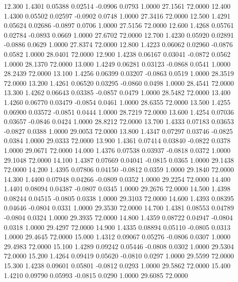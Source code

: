   12.300   1.4301   0.05388   0.02514  -0.0906   0.0793   1.0000  27.1561  72.0000
  12.400   1.4300   0.05502   0.02597  -0.0902   0.0748   1.0000  27.3416  72.0000
  12.500   1.4291   0.05624   0.02686  -0.0897   0.0706   1.0000  27.5156  72.0000
  12.600   1.4268   0.05761   0.02784  -0.0893   0.0669   1.0000  27.6702  72.0000
  12.700   1.4230   0.05920   0.02891  -0.0886   0.0629   1.0000  27.8374  72.0000
  12.800   1.4223   0.06062   0.02960  -0.0876   0.0582   1.0000  28.0401  72.0000
  12.900   1.4238   0.06167   0.03041  -0.0872   0.0562   1.0000  28.1370  72.0000
  13.000   1.4249   0.06281   0.03123  -0.0868   0.0541   1.0000  28.2439  72.0000
  13.100   1.4256   0.06399   0.03207  -0.0863   0.0519   1.0000  28.3519  72.0000
  13.200   1.4261   0.06520   0.03295  -0.0860   0.0498   1.0000  28.4541  72.0000
  13.300   1.4262   0.06643   0.03385  -0.0857   0.0479   1.0000  28.5482  72.0000
  13.400   1.4260   0.06770   0.03479  -0.0854   0.0461   1.0000  28.6355  72.0000
  13.500   1.4255   0.06900   0.03572  -0.0851   0.0444   1.0000  28.7219  72.0000
  13.600   1.4254   0.07036   0.03657  -0.0846   0.0424   1.0000  28.8212  72.0000
  13.700   1.4333   0.07183   0.03653  -0.0827   0.0388   1.0000  29.0053  72.0000
  13.800   1.4347   0.07297   0.03746  -0.0825   0.0384   1.0000  29.0333  72.0000
  13.900   1.4361   0.07414   0.03840  -0.0822   0.0378   1.0000  29.0671  72.0000
  14.000   1.4376   0.07538   0.03937  -0.0818   0.0372   1.0000  29.1048  72.0000
  14.100   1.4387   0.07669   0.04041  -0.0815   0.0365   1.0000  29.1438  72.0000
  14.200   1.4395   0.07806   0.04150  -0.0812   0.0359   1.0000  29.1840  72.0000
  14.300   1.4400   0.07948   0.04266  -0.0809   0.0352   1.0000  29.2254  72.0000
  14.400   1.4401   0.08094   0.04387  -0.0807   0.0345   1.0000  29.2676  72.0000
  14.500   1.4398   0.08244   0.04515  -0.0805   0.0338   1.0000  29.3103  72.0000
  14.600   1.4393   0.08395   0.04646  -0.0804   0.0331   1.0000  29.3530  72.0000
  14.700   1.4381   0.08553   0.04789  -0.0804   0.0324   1.0000  29.3935  72.0000
  14.800   1.4359   0.08722   0.04947  -0.0804   0.0318   1.0000  29.4297  72.0000
  14.900   1.4335   0.08894   0.05110  -0.0805   0.0313   1.0000  29.4645  72.0000
  15.000   1.4312   0.09067   0.05276  -0.0806   0.0307   1.0000  29.4983  72.0000
  15.100   1.4289   0.09242   0.05446  -0.0808   0.0302   1.0000  29.5304  72.0000
  15.200   1.4264   0.09419   0.05620  -0.0810   0.0297   1.0000  29.5599  72.0000
  15.300   1.4238   0.09601   0.05801  -0.0812   0.0293   1.0000  29.5862  72.0000
  15.400   1.4210   0.09790   0.05993  -0.0815   0.0290   1.0000  29.6085  72.0000
